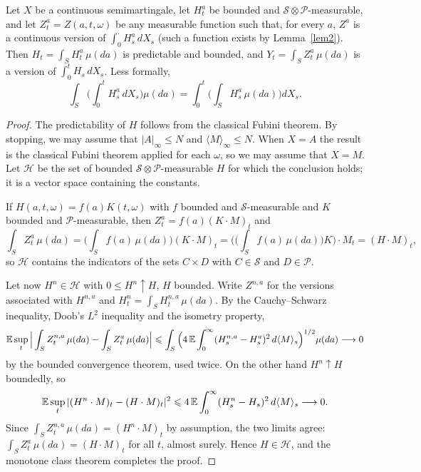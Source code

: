 \begin{theorem}\label{th5}
	Let $X$ be a continuous semimartingale, let $H^a_t$ be bounded and
	$\mathcal{S}\otimes \mathcal{P}$-measurable, and let $Z^a_t = Z(a,t,\omega)$ be
	any measurable function such that, for every $a$, $Z^a$ is a continuous
	version of $\int_0^\cdot H_s^a\,dX_s$ (such a function exists by
	Lemma~\ref{lem2}).
	Then $H_t=\int_S H^a_t\,\mu(da)$ is predictable and bounded, and
	$Y_t=\int_S Z^a_t\,\mu(da)$ is a version of $\int_0^t H_s\,dX_s$. Less formally,
	\[
		\int_S \Big(\int_0^t H^a_s\,dX_s\Big) \mu(da)=\int_0^t\Big(\int_S H^a_s\,\mu(da)\Big)dX_s .
	\]
\end{theorem}

\begin{proof}
	The predictability of $H$ follows from the classical Fubini theorem. By
	stopping, we may assume that $|A|_\infty \leqslant N$ and
	$\langle M\rangle_\infty \leqslant N$. When $X=A$ the result is the
	classical Fubini theorem applied for each $\omega$, so we may assume that
	$X=M$. Let $\mathcal{H}$ be the set of bounded $\mathcal{S}\otimes
	\mathcal{P}$-measurable $H$ for which the conclusion holds; it is a vector
	space containing the constants.

	If $H(a,t,\omega)=f(a)K(t,\omega)$ with $f$ bounded and
	$\mathcal{S}$-measurable and $K$ bounded and $\mathcal{P}$-measurable, then
	$Z^a_t=f(a)(K\cdot M)_t$ and
	\[
		\int_S Z^a_t\,\mu(da) = \Big(\int_S f(a)\,\mu(da)\Big)(K\cdot M)_t
		= \Big( \Big(\int_S f(a)\,\mu(da)\Big) K\Big) \cdot M_t = (H\cdot M)_t,
	\]
	so $\mathcal{H}$ contains the indicators of the sets $C\times D$ with
	$C\in\mathcal{S}$ and $D\in\mathcal{P}$.

	Let now $H^n\in\mathcal{H}$ with $0\leqslant H^n \uparrow H$, $H$ bounded.
	Write $Z^{n,a}$ for the versions associated with $H^{n,a}$ and
	$H^n_t = \int_S H^{n,a}_t\,\mu(da)$. By the Cauchy--Schwarz inequality,
	Doob's $L^2$ inequality and the isometry property,
	\[
		\mathbb{E} \sup_t \Big|\int_S Z^{n,a}_t\,\mu(da) - \int_S Z^a_t\,\mu(da)\Big|
		\leqslant \int_S \Big( 4\,\mathbb{E}\int_0^\infty (H^{n,a}_s - H^a_s)^2\,
		d\langle M\rangle_s \Big)^{1/2} \mu(da) \longrightarrow 0
	\]
	by the bounded convergence theorem, used twice. On the other hand
	$H^n \uparrow H$ boundedly, so
	\[
		\mathbb{E} \sup_t |(H^n\cdot M)_t - (H\cdot M)_t|^2 \leqslant
		4\,\mathbb{E}\int_0^\infty (H^n_s - H_s)^2\,d\langle M\rangle_s \longrightarrow 0 .
	\]
	Since $\int_S Z^{n,a}_t\,\mu(da) = (H^n\cdot M)_t$ by assumption, the two
	limits agree: $\int_S Z^{a}_t\,\mu(da) = (H\cdot M)_t$ for all $t$, almost
	surely. Hence $H\in\mathcal{H}$, and the monotone class theorem completes
	the proof.
\end{proof}

